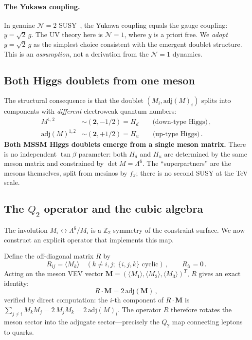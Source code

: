 \documentclass[12pt,a4paper]{article}
\newcommand{\adj}{\mathrm{adj}}
\begin{document}
\paragraph{The Yukawa coupling.}
In genuine $\mathcal{N}{=}2$
SUSY~\cite{Fayet:1976,SeibergWitten:1994},
the Yukawa coupling equals the gauge coupling:
$y = \sqrt{2}\,g$.
The UV theory here is $\mathcal{N}{=}1$, where $y$ is a priori
free.
We \emph{adopt} $y = \sqrt{2}\,g$ as the simplest choice
consistent with the emergent doublet structure.
This is an \emph{assumption}, not a derivation from the
$\mathcal{N}{=}1$ dynamics.


\subsection{Both Higgs doublets from one meson}

The structural consequence is that the doublet
$(M_i, \adj(M)_i)$ splits into components with \emph{different}
electroweak quantum numbers:
\begin{align}
  M^{1,2} &\sim (\mathbf{2}, -1/2) = H_d
    \qquad\text{(down-type Higgs)}\,,\\
  \adj(M)^{1,2} &\sim (\mathbf{2}, +1/2) = H_u
    \qquad\text{(up-type Higgs)}\,.
\end{align}
\textbf{Both MSSM Higgs doublets emerge from a single meson
matrix.}
There is no independent $\tan\beta$ parameter: both $H_d$ and
$H_u$ are determined by the same meson matrix and constrained by
$\det M = \Lambda^6$.
The ``superpartners'' are the mesons themselves, split from
mesinos by $f_\pi$; there is no second SUSY at the TeV scale.


\subsection{The $Q_2$ operator and the cubic algebra}

The involution $M_i \leftrightarrow \Lambda^6/M_i$ is a
$\mathbb{Z}_2$ symmetry of the constraint surface.
We now construct an explicit operator that implements this map.

Define the off-diagonal matrix $R$ by
\begin{equation}
  R_{ij} = \langle M_k\rangle \quad (k \neq i,j; \;\{i,j,k\}
  \text{ cyclic})\,, \qquad R_{ii} = 0\,.
  \label{eq:Rdef}
\end{equation}
Acting on the meson VEV vector
$\mathbf{M} = (\langle M_1\rangle, \langle M_2\rangle,
\langle M_3\rangle)^T$, $R$ gives an exact identity:
\begin{equation}
  R \cdot \mathbf{M} = 2\,\adj(\mathbf{M})\,,
  \label{eq:RM_adjM}
\end{equation}
verified by direct computation: the $i$-th component of $R
\cdot \mathbf{M}$ is $\sum_{j \neq i} M_k M_j = 2\,M_j M_k =
2\,\adj(M)_i$.
The operator $R$ therefore rotates the meson sector into the
adjugate sector---precisely the $Q_2$ map connecting leptons to
quarks.
\end{document}
